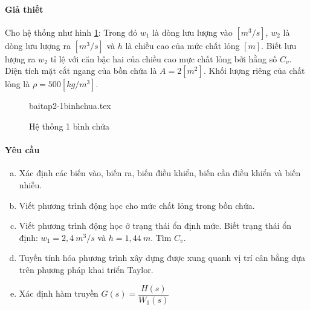 \paragraph{Giả thiết}
    Cho hệ thống như hình \ref{baitap2-1binhchua}: Trong đó $w_1$ là dòng lưu lượng vào $[m^3/s]$, $w_2$ là dòng lưu lượng ra $[m^3/s]$ và $h$ là chiều cao của mức chất lỏng $[m]$. Biết lưu lượng ra $w_2$ tỉ lệ với căn bậc hai của chiều cao mực chất lỏng bởi hằng số $C_v$. Diện tích mặt cắt ngang của bồn chứa là $A = 2[m^2]$. Khối lượng riêng của chất lỏng là $\rho = 500[kg/m^3]$.
    \begin{figure}[htp]
        \begin{center}
            {baitap2-1binhchua.tex}
        \end{center}
        \caption{Hệ thống 1 bình chứa} \label{baitap2-1binhchua}
    \end{figure}

\paragraph{Yêu cầu}
    \begin{enumerate}[a.]
        \item Xác định các biến vào, biến ra, biến điều khiển, biến cần điều khiển và biến nhiễu.
        \item Viết phương trình động học cho mức chất lỏng trong bồn chứa.
        \item Viết phương trình động học ở trạng thái ổn định mức. Biết trạng thái ổn định: $w_1 = 2,4~m^3/s$ và $h = 1,44~m$. Tìm $C_v$.
        \item Tuyến tính hóa phương trình xây dựng được xung quanh vị trí cân bằng dựa trên phương pháp khai triển Taylor.
        \item Xác định hàm truyền $G(s) = \dfrac{H(s)}{W_1(s)}$
    \end{enumerate}

